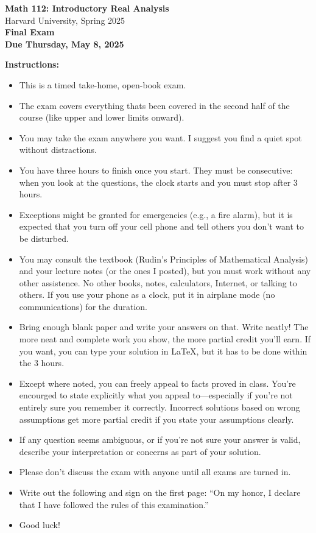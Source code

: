 \documentclass[12pt]{article}
\begin{document}
\begin{center}
  {\Large \textbf{Math 112: Introductory Real Analysis}}\\[0.5\baselineskip]
  {\large Harvard University, Spring 2025}\\[1\baselineskip]
  {\LARGE \textbf{Final Exam}}\\[0.5\baselineskip]
  \textbf{Due Thursday, May 8, 2025}
\end{center}

\noindent\textbf{Instructions:}
\begin{itemize}[leftmargin=*]
  \item This is a timed take-home, open-book exam.
  \item The exam covers everything thats been covered in the second half of the course (like upper and lower limits onward).
  \item You may take the exam anywhere you want. I suggest you find a quiet spot without distractions.
  \item You have three hours to finish once you start. They must be consecutive: when you look at the questions, the clock starts and you must stop after 3 hours.
  \item Exceptions might be granted for emergencies (e.g., a fire alarm), but it is expected that you turn off your cell phone and tell others you don’t want to be disturbed.
  \item You may consult the textbook (Rudin’s Principles of Mathematical Analysis) and your lecture notes (or the ones I posted), but you must work without any other assistence. No other books, notes, calculators, Internet, or talking to others. If you use your phone as a clock, put it in airplane mode (no communications) for the duration.
  \item Bring enough blank paper and write your answers on that. Write neatly! The more neat and complete work you show, the more partial credit you’ll earn. If you want, you can type your solution in \LaTeX, but it has to be done within the 3 hours.
  \item Except where noted, you can freely appeal to facts proved in class. You’re encourged to state explicitly what you appeal to—especially if you’re not entirely sure you remember it correctly. Incorrect solutions based on wrong assumptions get more partial credit if you state your assumptions clearly.
  \item If any question seems ambiguous, or if you’re not sure your answer is valid, describe your interpretation or concerns as part of your solution.
  \item Please don’t discuss the exam with anyone until all exams are turned in.
  \item Write out the following and sign on the first page: “On my honor, I declare that I have followed the rules of this examination.”
  \item Good luck!
\end{itemize}
\end{document}
